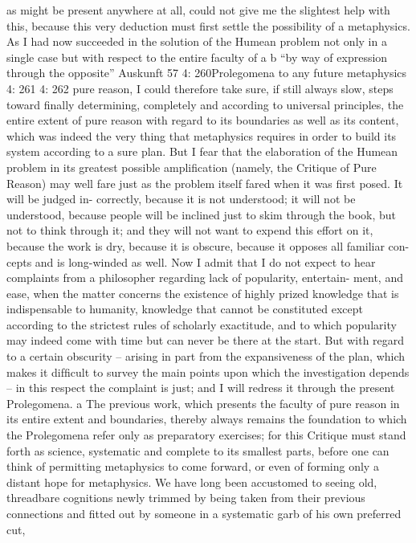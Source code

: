 as might be present anywhere at all, could not give me the slightest help
with this, because this very deduction must ﬁrst settle the possibility of
a metaphysics. As I had now succeeded in the solution of the Humean
problem not only in a single case but with respect to the entire faculty of
a
b
“by way of expression through the opposite”
Auskunft
57
4: 260Prolegomena to any future metaphysics
4: 261
4: 262
pure reason, I could therefore take sure, if still always slow, steps toward
ﬁnally determining, completely and according to universal principles,
the entire extent of pure reason with regard to its boundaries as well as
its content, which was indeed the very thing that metaphysics requires
in order to build its system according to a sure plan.
But I fear that the elaboration of the Humean problem in its greatest
possible ampliﬁcation (namely, the Critique of Pure Reason) may well fare
just as the problem itself fared when it was ﬁrst posed. It will be judged in-
correctly, because it is not understood; it will not be understood, because
people will be inclined just to skim through the book, but not to think
through it; and they will not want to expend this effort on it, because
the work is dry, because it is obscure, because it opposes all familiar con-
cepts and is long-winded as well. Now I admit that I do not expect to hear
complaints from a philosopher regarding lack of popularity, entertain-
ment, and ease, when the matter concerns the existence of highly prized
knowledge that is indispensable to humanity, knowledge that cannot be
constituted except according to the strictest rules of scholarly exactitude,
and to which popularity may indeed come with time but can never be
there at the start. But with regard to a certain obscurity – arising in part
from the expansiveness of the plan, which makes it difﬁcult to survey the
main points upon which the investigation depends – in this respect the
complaint is just; and I will redress it through the present Prolegomena. a
The previous work, which presents the faculty of pure reason in its
entire extent and boundaries, thereby always remains the foundation to
which the Prolegomena refer only as preparatory exercises; for this Critique
must stand forth as science, systematic and complete to its smallest parts,
before one can think of permitting metaphysics to come forward, or even
of forming only a distant hope for metaphysics.
We have long been accustomed to seeing old, threadbare cognitions
newly trimmed by being taken from their previous connections and
ﬁtted out by someone in a systematic garb of his own preferred cut,
